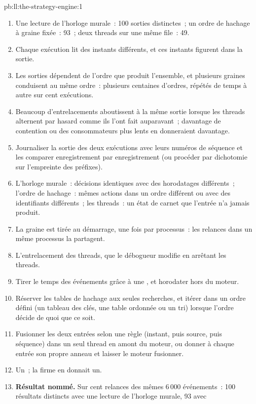 \begin{solution}{pb:ll:the-strategy-engine:1}
\begin{enumerate}
\item Une lecture de l'horloge murale~: 100 sorties distinctes~; un ordre de hachage à graine fixée~: 93~; deux threads sur une même file~: 49.
\item Chaque exécution lit des instants différents, et ces instants figurent dans la sortie.
\item Les sorties dépendent de l'ordre que produit l'ensemble, et plusieurs graines conduisent au même ordre~: plusieurs centaines d'ordres,
répétés de temps à autre sur cent exécutions.
\item Beaucoup d'entrelacements aboutissent à la même sortie lorsque les threads alternent par hasard comme ils l'ont fait auparavant~; davantage de contention ou
des consommateurs plus lents en donneraient davantage.
\item Journaliser la sortie des deux exécutions avec leurs numéros de séquence et les comparer enregistrement par enregistrement (ou procéder par dichotomie sur l'empreinte des préfixes).
\item L'horloge murale~: décisions identiques avec des horodatages différents~; l'ordre de hachage~: mêmes actions dans un ordre différent ou
avec des identifiants différents~; les threads~: un état de carnet que l'entrée n'a jamais produit.
\item La graine est tirée au démarrage, une fois par processus~: les relances dans un même processus la partagent.
\item L'entrelacement des threads, que le débogueur modifie en arrêtant les threads.
\item Tirer le temps des événements grâce à une , et horodater hors du moteur.
\item Réserver les tables de hachage aux seules recherches, et itérer dans un ordre défini (un tableau des clés, une table ordonnée ou un tri) lorsque
l'ordre décide de quoi que ce soit.
\item Fusionner les deux entrées selon une règle (instant, puis source, puis séquence) dans un seul thread en amont du moteur, ou donner à chaque entrée son
propre anneau et laisser le moteur fusionner.
\item Un~; la firme en donnait un.
\item \textbf{Résultat nommé.} Sur cent relances des mêmes 6\,000 événements~: 100 résultats distincts avec une lecture de l'horloge murale, 93 avec

\end{enumerate}
\end{solution}
